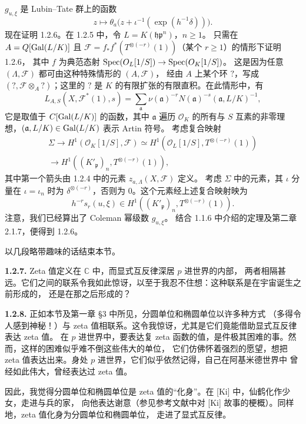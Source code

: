 $g_{u,\xi}$ 是 Lubin--Tate 群上的函数
\[
z\longmapsto\theta_a\bigl(z+\iota^{-1}(\exp(h^{-1}\delta))\bigr).
\]
现在证明 1.2.6。在 1.2.5 中，令 $L=K(\mathfrak h\mathfrak p^n)$，$n\geq1$。
只需在 $A=Q[\operatorname{Gal}(L/K)]$ 且
$\mathscr F=f_*f^*(T^{\otimes(-r)}(1))$（某个 $r\geq1$）的情形下证明 1.2.6，
其中 $f$ 为典范态射 $\operatorname{Spec}(O_L[1/S])\to\operatorname{Spec}(O_K[1/S])$。
这是因为任意 $(\Lambda,\mathscr F)$ 都可由这种特殊情形的 $(A,\mathscr F)$，
经由 $A$ 上某个环 $?$，写成 $(?,\mathscr F\otimes_A?)$；这里的 $?$ 是
$K$ 的有限扩张的有限直积。在此情形中，有
\[
L_{A,S}(X,\mathscr F^*(1),s)
=\sum_{\mathfrak a}\nu(\mathfrak a)^{-r}N(\mathfrak a)^{-s}(\mathfrak a,L/K)^{-1},
\]
它是取值于 $C[\operatorname{Gal}(L/K)]$ 的函数，其中 $\mathfrak a$ 遍历
$\mathcal O_K$ 的所有与 $S$ 互素的非零理想，$(\mathfrak a,L/K)\in\operatorname{Gal}(L/K)$ 表示 Artin 符号。
考虑复合映射
\[
\begin{gathered}
\Sigma\longrightarrow H^1(\mathcal O_K[1/S],\mathscr F)
\simeq H^1(\mathcal O_L[1/S],T^{\otimes(-r)}(1))\\
\longrightarrow H^1((K'_{\mathfrak p})_n,T^{\otimes(-r)}(1)),
\end{gathered}
\]
其中第一个箭头由 1.2.4 中的元素 $z_{a,\Lambda}(X,\mathscr F)$ 定义。
考虑 $\Sigma$ 中的元素，其 $\iota$ 分量在 $\iota=\iota_n$ 时为
$\delta^{\otimes(-r)}$，否则为 $0$。这个元素经上述复合映射映为
\[
h^{-r}s_r(u,\xi)\in H^1((K'_{\mathfrak p})_n,T^{\otimes(-r)}(1)).
\]
注意，我们已经算出了 Coleman 幂级数 $g_{u,\xi}$。
结合 1.1.6 中介绍的定理及第二章 2.1.7，便得到 1.2.6。

以几段略带趣味的话结束本节。

\noindent\textbf{1.2.7.} Zeta 值定义在 $\mathbb C$ 中，而显式互反律深居 $p$ 进世界的内部，
两者相隔甚远。它们之间的联系令我如此惊讶，以至于我忍不住想：这种联系是在宇宙诞生之前形成的，
还是在那之后形成的？

\noindent\textbf{1.2.8.} 正如本节及第一章 §3 中所见，分圆单位和椭圆单位以许多种方式
（多得令人感到神秘！）与 zeta 值相联系。这令我惊讶，尤其是它们竟能借助显式互反律表达 zeta 值。
在 $p$ 进世界中，要表达复 zeta 函数的值，是件极其困难的事。然而，这样的困难似乎难不倒这些伟大的单位，
它们仿佛怀着强烈的愿望，想把 zeta 值表达出来。身处 $p$ 进世界，它们似乎依然记得，自己在阿基米德世界中
曾经如此伟大，曾经表达过 zeta 值。

因此，我觉得分圆单位和椭圆单位是 zeta 值的“化身”。在 [Ki] 中，仙鹤化作少女，走进与兵的家，
向他表达谢意（参见参考文献中对 [Ki] 故事的梗概）。同样地，zeta 值化身为分圆单位和椭圆单位，
走进了显式互反律。

